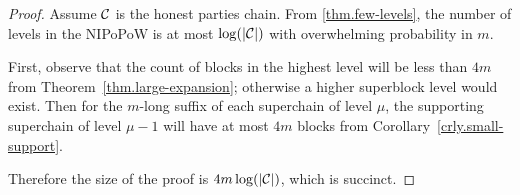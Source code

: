 \begin{proof}
    Assume $\mathcal{C}$ is the honest parties chain. From \ref{thm.few-levels}, the
    number of levels in the NIPoPoW is at most $\log(|\mathcal{C}|)$ with
    overwhelming probability in $m$.

    First, observe that the count of blocks in the highest level will be less
    than $4m$ from Theorem~\ref{thm.large-expansion}; otherwise a higher
    superblock level would exist. Then for the $m$-long suffix of each
    superchain of level $\mu$, the supporting superchain of level $\mu - 1$
    will have at most $4m$ blocks from Corollary~\ref{crly.small-support}.

    Therefore the size of the proof is $4m \log(|\mathcal{C}|)$, which is succinct.
\end{proof}
